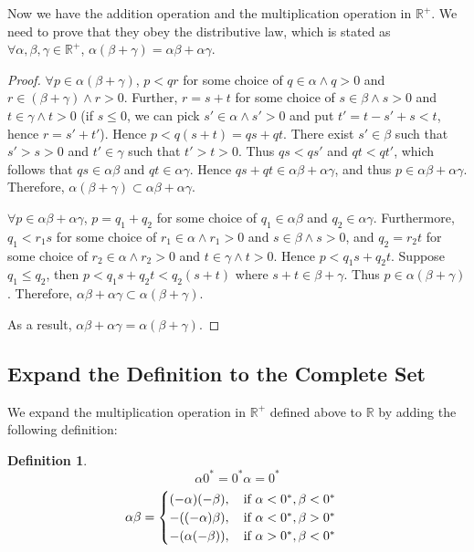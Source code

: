 \documentclass[onecolumn]{article}
\newtheorem{definition}{Definition}
\begin{document}
Now we have the addition operation and the multiplication operation in 
$\mathbb{R^+}$. We need to prove that they obey the distributive law, which is 
stated as $\forall \alpha, \beta, \gamma \in \mathbb{R^+}$, 
$\alpha (\beta + \gamma) = \alpha \beta + \alpha \gamma$.
\begin{proof}
  $\forall p \in \alpha (\beta + \gamma)$, $p < qr$ for some choice of 
  $q \in \alpha \wedge q > 0$ and $r \in (\beta + \gamma) \wedge r > 0$. 
  Further, $r = s + t$ for some choice of $s \in \beta \wedge s > 0$ and 
  $t \in \gamma \wedge t > 0$ (if $s \leq 0$, we can pick 
  $s' \in \alpha \wedge s' > 0$ and put $t' = t - s' + s < t$, hence 
  $r = s' + t'$). Hence $p < q (s + t) = qs + qt$. There exist $s' \in \beta$ 
  such that $s' > s > 0$ and $t' \in \gamma$ such that $t' > t > 0$. Thus 
  $qs < qs'$ and $qt < qt'$, which follows that $qs \in \alpha \beta$ and 
  $qt \in \alpha \gamma$. Hence $qs + qt \in \alpha \beta + \alpha \gamma$, and 
  thus $p \in \alpha \beta + \alpha \gamma$. Therefore, 
  $\alpha (\beta + \gamma) \subset \alpha \beta + \alpha \gamma$.

  $\forall p \in \alpha \beta + \alpha \gamma$, $p = q_1 + q_2$ for some choice 
  of $q_1 \in \alpha \beta$ and $q_2 \in \alpha \gamma$. Furthermore, 
  $q_1 < r_1 s$ for some choice of $r_1 \in \alpha \wedge r_1 > 0$ and 
  $s \in \beta \wedge s > 0$, and $q_2 = r_2 t$ for some choice of 
  $r_2 \in \alpha \wedge r_2 > 0$ and $t \in \gamma \wedge t > 0$. Hence 
  $p < q_1 s + q_2 t$. Suppose $q_1 \leq q_2$, then 
  $p < q_1 s + q_2 t < q_2 (s + t)$ where $s + t \in \beta + \gamma$. Thus 
  $p \in \alpha (\beta + \gamma)$. Therefore, 
  $\alpha \beta + \alpha \gamma \subset \alpha (\beta + \gamma)$.

  As a result, $\alpha \beta + \alpha \gamma = \alpha (\beta + \gamma)$.
\end{proof}

\subsection{Expand the Definition to the Complete Set}

We expand the multiplication operation in $\mathbb{R^+}$ defined above to 
$\mathbb{R}$ by adding the following definition:
\begin{definition}
  \[
    \alpha 0^* = 0^* \alpha = 0^*
  \]
  \[
    \alpha \beta = 
    \begin{cases}
      (-\alpha)(-\beta), \quad \textnormal{if } \alpha < 0^*, \beta < 0^* \\
      -((-\alpha)\beta), \quad \textnormal{if } \alpha < 0^*, \beta > 0^* \\
      -(\alpha(-\beta)), \quad \textnormal{if } \alpha > 0^*, \beta < 0^*       
    \end{cases}
  \]
\end{definition}
\end{document}
